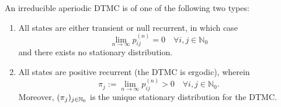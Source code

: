 \documentclass[a4paper,10pt]{article}
\begin{document}
\begin{thm}
  An irreducible aperiodic DTMC is of one of the following two types:
\begin{enumerate}
	\item All states are either transient or null recurrent, in which case \[\lim_{n \to \infty} p_{ij}^{(n)} = 0 \quad \forall i,j \in \mathbb{N}_0\] and there exists no stationary distribution.
	\item All states are positive recurrent (the DTMC is ergodic), wherein
          \[ \pi_j := \lim_{n \to \infty} p_{ij}^{(n)} > 0 \quad
          \forall i,j \in \mathbb{N}_0.\]
          Moreover, $(\pi_j)_{j \in \mathbb{N}_0}$ is the unique stationary
          distribution for the DTMC.
\end{enumerate}
\end{thm}
\end{document}
